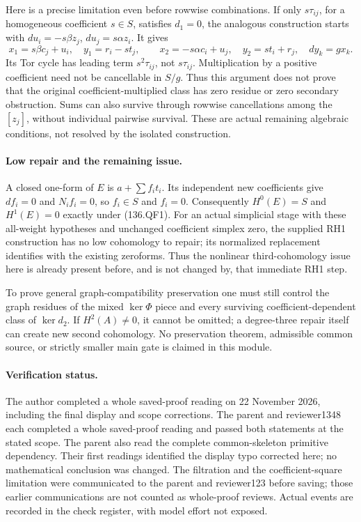 Here is a precise limitation even before rowwise combinations.
If only \(s\tau_{ij}\), for a homogeneous coefficient
\(s\in S\), satisfies \(d_1=0\), the analogous construction
starts with
\(du_i=-s\beta z_j\), \(du_j=s\alpha z_i\).
It gives
\[
 x_1=s\beta c_j+u_i,\quad y_1=r_i-s t_j,\qquad
 x_2=-s\alpha c_i+u_j,\quad y_2=s t_i+r_j,
 \quad dy_k=gx_k.
                                                               \tag{136.QF18}
\]
Its Tor cycle has leading term \(s^2\tau_{ij}\), not
\(s\tau_{ij}\).  Multiplication by a positive coefficient
need not be cancellable in \(S/g\).  Thus this argument
does not prove that the original coefficient-multiplied class
has zero residue or zero secondary obstruction.  Sums can also
survive through rowwise cancellations among the \([z_j]\),
without individual pairwise survival.  These are actual remaining
algebraic conditions, not resolved by the isolated construction.

\paragraph{Low repair and the remaining issue.}
A closed one-form of \(E\) is \(a+\sum f_i t_i\).
Its independent new coefficients give \(df_i=0\) and
\(N_i f_i=0\), so \(f_i\in S\) and \(f_i=0\).
Consequently \(H^0(E)=S\) and \(H^1(E)=0\) exactly
under (136.QF1).  For an actual simplicial stage with these
all-weight hypotheses and unchanged coefficient simplex zero,
the supplied RH1 construction has no low cohomology to repair;
its normalized replacement identifies with the existing zeroforms.
Thus the nonlinear third-cohomology issue here is already present
before, and is not changed by, that immediate RH1 step.

To prove general graph-compatibility preservation one must still
control the graph residues of the mixed \(\ker\Phi\) piece
and every surviving coefficient-dependent class of \(\ker d_2\).
If \(H^2(A)\ne0\), it cannot be omitted; a degree-three
repair itself can create new second cohomology.  No preservation
theorem, admissible common source, or strictly smaller main gate
is claimed in this module.

\paragraph{Verification status.}
The author completed a whole saved-proof reading on 22 November
2026, including the final display and scope corrections.  The
parent and reviewer1348 each completed a whole saved-proof reading
and passed both statements at the stated scope.  The parent also
read the complete common-skeleton primitive dependency.  Their
first readings identified the display typo corrected here; no
mathematical conclusion was changed.  The filtration and the
coefficient-square limitation were communicated to the parent
and reviewer123 before saving; those earlier communications are
not counted as whole-proof reviews.  Actual events are recorded
in the check register, with model effort not exposed.
